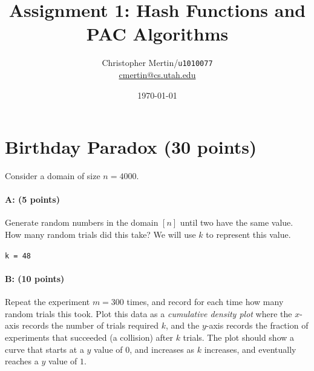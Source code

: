 \documentclass[11pt]{article}
\title{Assignment 1: Hash Functions and PAC Algorithms}
\author{Christopher Mertin/\verb~u1010077~\\\url{cmertin@cs.utah.edu}}
\date{\today}
\begin{document}
\maketitle













\section{Birthday Paradox (30 points)}

Consider a domain of size $n = 4000$.  

\paragraph{A: (5 points)}
Generate random numbers in the domain $[n]$ until two have the same value.  How many random trials did this take?  
We will use $k$ to represent this value.  

\verb~k = 48~

\paragraph{B: (10 points)}  
Repeat the experiment $m = 300$ times, and record for each time how many random trials this took.  Plot this data as a \emph{cumulative density plot} where the $x$-axis records the number of trials required $k$, and the $y$-axis records the fraction of experiments that succeeded (a collision) after $k$ trials.  The plot should show a curve that starts at a $y$ value of $0$, and increases as $k$ increases, and eventually reaches a $y$ value of $1$.  
\end{document}
